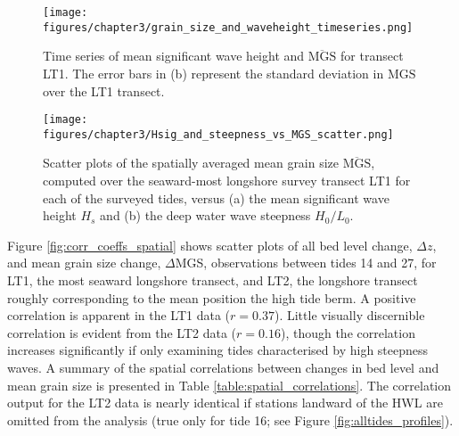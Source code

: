 \documentclass[jmse,article,submit,pdftex,moreauthors]{Definitions/mdpi}
\begin{document}
\begin{figure}[tbp] %
	\begin{center}
		\texttt{[image: figures/chapter3/grain\_size\_and\_waveheight\_timeseries.png]}
		\caption[Time series of mean significant wave height and mean surficial grian size]{Time series of mean significant wave height and $\overline{\mathrm{MGS}}$ for transect LT1. The error bars in (b) represent the standard deviation in $\mathrm{MGS}$ over the LT1 transect.\label{fig:hsig_mgs}}
	\end{center}
\end{figure}

\begin{figure}[tbp] %
	\begin{center}
		\texttt{[image: figures/chapter3/Hsig\_and\_steepness\_vs\_MGS\_scatter.png]}
		\caption[Mean surfical grain size versus significant wave height, wave steepness]{Scatter plots of the spatially averaged mean grain size $\overline{\mathrm{MGS}}$, computed over the seaward-most longshore survey transect LT1 for each of the surveyed tides, versus (a) the mean significant wave height $H_s$ and (b) the deep water wave steepness $H_0/L_0$. \label{fig:hsig_steepness_mgs_scatter}}
	\end{center}
\end{figure}

Figure \ref{fig:corr_coeffs_spatial} shows scatter plots of all bed level change, $\Delta z$, and mean grain size change, $\Delta$MGS, observations between tides 14 and 27, for LT1, the most seaward longshore transect, and LT2, the longshore transect roughly corresponding to the mean position the high tide berm. A positive correlation is apparent in the LT1 data ($r=0.37$). Little visually discernible correlation is evident from the LT2 data ($r=0.16$), though the correlation increases significantly if only examining tides characterised by high steepness waves. A summary of the spatial correlations between changes in bed level and mean grain size is presented in Table \ref{table:spatial_correlations}. The correlation output for the LT2 data is nearly identical if stations landward of the HWL are omitted from the analysis (true only for tide 16; see Figure \ref{fig:alltides_profiles}).
\end{document}

